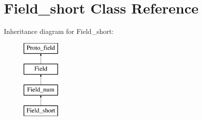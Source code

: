 \hypertarget{classField__short}{}\section{Field\+\_\+short Class Reference}
\label{classField__short}
Inheritance diagram for Field\+\_\+short\+:\begin{figure}[H]
\begin{center}
\leavevmode
\includegraphics[height=4.000000cm]{classField__short}
\end{center}
\end{figure}
